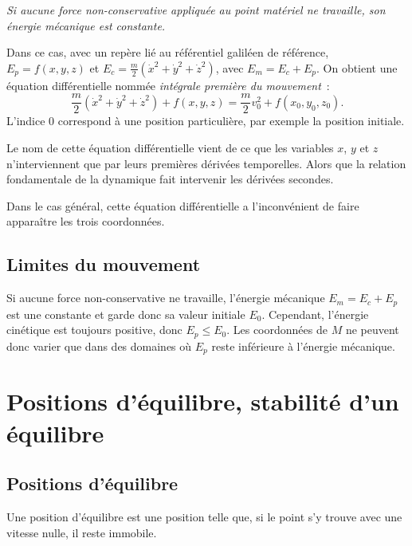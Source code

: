 \emph{Si aucune force non-conservative appliquée au point matériel ne 
travaille, son énergie mécanique est constante.}%

Dans ce cas, avec un repère lié au référentiel galiléen de référence, 
\(E_p=f(x,y,z)\) et \(E_c = \frac{m}{2}(\dot{x}^2+\dot{y}^2+\dot{z}^2)\), avec 
\(E_m=E_c+E_p\). On obtient une équation différentielle nommée \emph{intégrale 
première du mouvement}~:
\begin{equation}%
  \frac{m}{2}(\dot{x}^2+\dot{y}^2+\dot{z}^2) + f(x,y,z) = 
  \frac{m}{2}v_0^2+f(x_0,y_0,z_0).
\end{equation}%
L'indice \(0\) correspond à une position particulière, par exemple la position 
initiale.

Le nom de cette équation différentielle vient de ce que les variables \(x\), 
\(y\) et \(z\) n'interviennent que par leurs premières dérivées temporelles. 
Alors que la relation fondamentale de la dynamique fait intervenir les dérivées 
secondes.

Dans le cas général, cette équation différentielle a l'inconvénient de faire 
apparaître les trois coordonnées.

\subsection{Limites du mouvement}%
\label{chap4-subsec:limitesdumvt}%

Si aucune force non-conservative ne travaille, l'énergie mécanique 
\(E_m=E_c+E_p\) est une constante et garde donc sa valeur initiale \(E_0\). 
Cependant, l'énergie cinétique est toujours positive, donc \(E_p \leq E_0\). 
Les coordonnées de \(M\) ne peuvent donc varier que dans des domaines où 
\(E_p\) reste inférieure à l'énergie mécanique.

\section{Positions d'équilibre, stabilité d'un équilibre}%
\label{chap4-sec:positiondequilibre}%

\subsection{Positions d'équilibre}%
\label{chap4-subsec:positionsdequilibre}%

\begin{defdef}%
Une position d'équilibre est une position telle que, si le point s'y trouve 
  avec une vitesse nulle, il reste immobile.
\end{defdef}%

